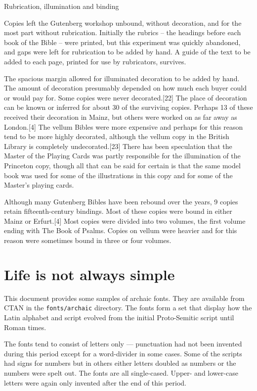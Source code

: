 {{Rubrication, illumination and binding

Copies left the Gutenberg workshop unbound, without decoration, and for the most part without rubrication.
Initially the rubrics -- the headings before each book of the Bible -- were printed, but this experiment was quickly abandoned, and gaps were left for rubrication to be added by hand. A guide of the text to be added to each page, printed for use by rubricators, survives.\cite{Kapr1996}

The spacious margin allowed for illuminated decoration to be added by hand. The amount of decoration presumably depended on how much each buyer could or would pay for. Some copies were never decorated.[22] The place of decoration can be known or inferred for about 30 of the surviving copies. Perhaps 13 of these received their decoration in Mainz, but others were worked on as far away as London.[4] The vellum Bibles were more expensive and perhaps for this reason tend to be more highly decorated, although the vellum copy in the British Library is completely undecorated.[23] There has been speculation that the Master of the Playing Cards was partly responsible for the illumination of the Princeton copy, though all that can be said for certain is that the same model book was used for some of the illustrations in this copy and for some of the Master's playing cards.\cite{Buren1974}

Although many Gutenberg Bibles have been rebound over the years, 9 copies retain fifteenth-century bindings. Most of these copies were bound in either Mainz or Erfurt.[4] Most copies were divided into two volumes, the first volume ending with The Book of Psalms. Copies on vellum were heavier and for this reason were sometimes bound in three or four volumes.\cite{Martin1996}

\section{Life is not always simple}
 This document provides some samples of archaic fonts. They are
available from CTAN in the \texttt{fonts/archaic} directory. The fonts
form a set that display how the Latin alphabet and script evolved from the
initial Proto-Semitic script until Roman times.

    The fonts tend to consist of letters only --- punctuation had not 
been invented during this period except for a word-divider in some cases.
Some of the scripts had signs for numbers but in others either letters
doubled as numbers or the numbers were spelt out. The fonts are all
single-cased. Upper- and lower-case letters were again only invented after
the end of this period.

}}
